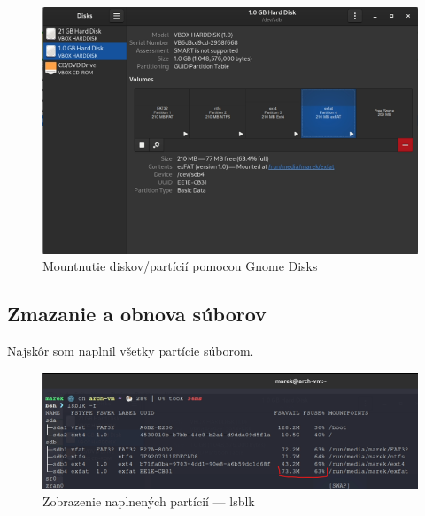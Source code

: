 \documentclass[12pt,oneside,slovak,a4paper]{article}
\begin{document}
\begin{figure}[H]
	\centering
	\captionsetup{justification=centering,margin=2cm}
	\includegraphics[scale=0.7]{./images/testdisk_testing/disk-mount-gnome-disks.png}
	\centering
	\caption{Mountnutie diskov/partícií pomocou Gnome Disks}
\end{figure}

\pagebreak


\subsection{Zmazanie a obnova súborov}
Najskôr som naplnil všetky partície súborom.

\begin{figure}[H]
	\centering
	\includegraphics[scale=0.7]{./images/testdisk_testing/naplnenie_particii_lsblk.png}
	\centering
	\captionsetup{justification=centering,margin=2cm}
	\caption{Zobrazenie naplnených partícií --- lsblk}
\end{figure}
\end{document}
